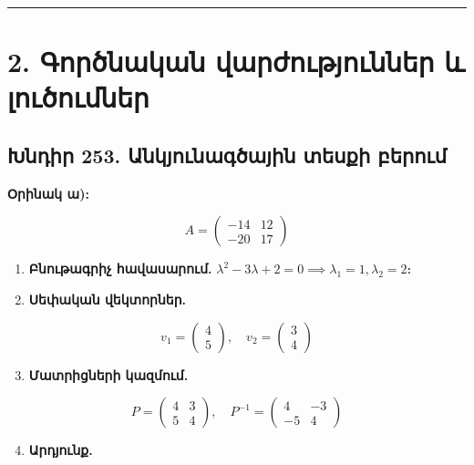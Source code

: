 \documentclass[12pt, a4paper]{article}
\begin{document}
\vspace{1em}
\hrule
\vspace{1em}

\section{2. Գործնական վարժություններ և լուծումներ}

\subsection{Խնդիր 253. Անկյունագծային տեսքի բերում}

\textbf{Օրինակ ա):}

$$
A = \begin{pmatrix}
-14 & 12 \\
-20 & 17
\end{pmatrix}
$$

\begin{enumerate}
    \item \textbf{Բնութագրիչ հավասարում.} $\lambda^2 - 3\lambda + 2 = 0 \implies \lambda_1 = 1, \lambda_2 = 2$։
    \item \textbf{Սեփական վեկտորներ.}
\end{enumerate}

$$
v_1 =
\begin{pmatrix}
4 \\
5
\end{pmatrix},
\quad
v_2 =
\begin{pmatrix}
3 \\
4
\end{pmatrix}
$$

\begin{enumerate}
    \setcounter{enumi}{2}
    \item \textbf{Մատրիցների կազմում.}
\end{enumerate}

$$
P =
\begin{pmatrix}
4 & 3 \\
5 & 4
\end{pmatrix},
\quad
P^{-1} =
\begin{pmatrix}
4 & -3 \\
-5 & 4
\end{pmatrix}
$$

\begin{enumerate}
    \setcounter{enumi}{3}
    \item \textbf{Արդյունք.}
\end{enumerate}
\end{document}
